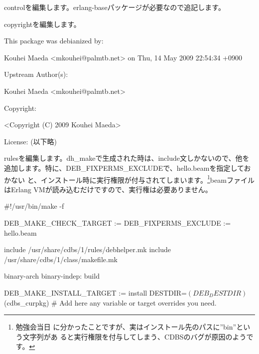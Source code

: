 \documentclass[mingoth,a4paper]{jsarticle}
\begin{document}
controlを編集します。erlang-baseパッケージが必要なので追記します。


copyrightを編集します。
\begin{commandline}
This package was debianized by:

    Kouhei Maeda <mkouhei@palmtb.net> on Thu, 14 May 2009 22:54:34 +0900

Upstream Author(s):

    Kouhei Maeda <mkouhei@palmtb.net>

Copyright:

    <Copyright (C) 2009 Kouhei Maeda>

License:
(以下略)
\end{commandline}

rulesを編集します。dh\_makeで生成された時は、include文しかないので、他を
追加します。特に、DEB\_FIXPERMS\_EXCLUDEで、hello.beamを指定しておかない
と、インストール時に実行権限が付与されてしまいます。\footnote{勉強会当日
に分かったことですが、実はインストール先のパスに''bin''という文字列があ
ると実行権限を付与してしまう、CDBSのバグが原因のようです。}beamファイルはErlang
VMが読み込むだけですので、実行権は必要ありません。
\begin{commandline}
#!/usr/bin/make -f

DEB_MAKE_CHECK_TARGET :=
DEB_FIXPERMS_EXCLUDE := hello.beam

include /usr/share/cdbs/1/rules/debhelper.mk
include /usr/share/cdbs/1/class/makefile.mk

binary-arch binary-indep: build

DEB_MAKE_INSTALL_TARGET := install DESTDIR=$(DEB_DESTDIR)$(cdbs_curpkg)
# Add here any variable or target overrides you need.
\end{commandline}
\end{document}

